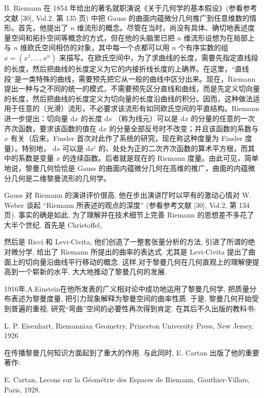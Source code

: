 B. Riemann 在 1854 年给出的著名就职演说《关于几何学的基本假设》(参看参考文献 [30], Vol.2, 第 135 页) 中把 Gauss 的曲面内蕴微分几何推广到任意维数的情形。首先，他提出了  $n$  维流形的概念。尽管在当时，尚没有具体、确切地表述度量空间和拓扑空间等概念的方式，但在他的头脑里已把  $n$  维流形设想为在局部上与  $n$  维欧氏空间相仿的对象，其中每一个点都可以用  $n$  个有序实数的组  $x = (x^{1}, \dots, x^{n})$  来描写。在欧氏空间中，为了求曲线的长度，需要先指定直线段的长度，然后把曲线的长度定义为它的内接折线长度的上确界。在这里，“直线段”是一类特殊的曲线，需要预先把它从一般的曲线中区分出来。现在，Riemann 提出一种与之不同的统一的模式，不需要预先区分直线和曲线，而是先定义切向量的长度，然后把曲线的长度定义为切向量的长度沿曲线的积分。因而，这种做法适用于任意的（光滑）流形，不必要求该流形有如同欧氏空间的平直结构。Riemann 进一步提出：切向量  $\mathrm{d}x$  的长度  $\mathrm{d}s$ （称为线元）可以是  $\mathrm{d}x$  的分量的任意的一次齐次函数，要求该函数的值在  $\mathrm{d}x$  的分量全部反号时不改变；并且该函数的系数与  $x$  有关（后来，Finsler 首次对此作了系统的研究，现在称这种度量为 Finsler 度量）。特别地， $\mathrm{d}s$  可以是  $\mathrm{d}x^{i}$  的、处处为正的二次齐次函数的算术平方根，而其中的系数是变量  $x$  的连续函数。后者就是现在的 Riemann 度量。由此可见，简单地说，黎曼几何恰恰是 Gauss 的曲面内蕴微分几何在高维的推广，曲面的内蕴微分几何是二维黎曼流形的几何学。

Gauss 对 Riemann 的演讲评价很高, 他在步出演讲厅时以罕有的激动心情对 W. Weber 谈起 “Riemann 所表述的观点的深度” (参看参考文献 [30], Vol.2, 第 134 页). 事实的确是如此, 为了理解并在技术细节上完善 Riemann 的思想差不多花了大半个世纪. 首先是 Christoffel,

然后是 Ricci 和 Levi-Civita, 他们创造了一整套张量分析的方法, 引进了所谓的绝对微分学, 给出了 Riemann 所提出的曲率的表达式. 尤其是 Levi-Civita 提出了曲面上的切向量沿曲线平行移动的概念. 这样,对于黎曼几何在几何直观上的理解便提高到一个崭新的水平, 大大地推动了黎曼几何的发展.

1916年,A.Einstein在他所发表的广义相对论中成功地运用了黎曼几何学, 把质量分布表述为黎曼度量, 把引力现象解释为黎曼空间的曲率性质. 于是, 黎曼几何开始受到普遍的重视, 研究“弯曲”空间的必要性再次得到肯定. 在其后不久出版的教科书:

L. P. Eisenhart, Riemannian Geometry, Princeton University Press, New Jersey, 1926

在传播黎曼几何知识方面起到了重大的作用. 与此同时, E. Cartan 出版了他的重要著作:

E. Cartan, Lecons sur la Géométrie des Espaces de Riemann, Gauthier-Villars, Paris, 1928.

